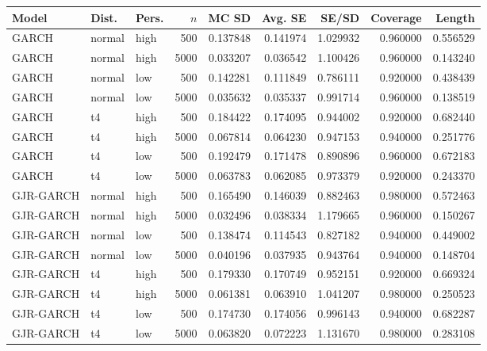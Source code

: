 \begin{tabular}{lllrrrrrr}
\toprule
Model & Dist. & Pers. & $n$ & MC SD & Avg. SE & SE/SD & Coverage & Length \\
\midrule
GARCH & normal & high & 500 & 0.137848 & 0.141974 & 1.029932 & 0.960000 & 0.556529 \\
GARCH & normal & high & 5000 & 0.033207 & 0.036542 & 1.100426 & 0.960000 & 0.143240 \\
GARCH & normal & low & 500 & 0.142281 & 0.111849 & 0.786111 & 0.920000 & 0.438439 \\
GARCH & normal & low & 5000 & 0.035632 & 0.035337 & 0.991714 & 0.960000 & 0.138519 \\
GARCH & t4 & high & 500 & 0.184422 & 0.174095 & 0.944002 & 0.920000 & 0.682440 \\
GARCH & t4 & high & 5000 & 0.067814 & 0.064230 & 0.947153 & 0.940000 & 0.251776 \\
GARCH & t4 & low & 500 & 0.192479 & 0.171478 & 0.890896 & 0.960000 & 0.672183 \\
GARCH & t4 & low & 5000 & 0.063783 & 0.062085 & 0.973379 & 0.920000 & 0.243370 \\
GJR-GARCH & normal & high & 500 & 0.165490 & 0.146039 & 0.882463 & 0.980000 & 0.572463 \\
GJR-GARCH & normal & high & 5000 & 0.032496 & 0.038334 & 1.179665 & 0.960000 & 0.150267 \\
GJR-GARCH & normal & low & 500 & 0.138474 & 0.114543 & 0.827182 & 0.940000 & 0.449002 \\
GJR-GARCH & normal & low & 5000 & 0.040196 & 0.037935 & 0.943764 & 0.940000 & 0.148704 \\
GJR-GARCH & t4 & high & 500 & 0.179330 & 0.170749 & 0.952151 & 0.920000 & 0.669324 \\
GJR-GARCH & t4 & high & 5000 & 0.061381 & 0.063910 & 1.041207 & 0.980000 & 0.250523 \\
GJR-GARCH & t4 & low & 500 & 0.174730 & 0.174056 & 0.996143 & 0.940000 & 0.682287 \\
GJR-GARCH & t4 & low & 5000 & 0.063820 & 0.072223 & 1.131670 & 0.980000 & 0.283108 \\
\bottomrule
\end{tabular}
